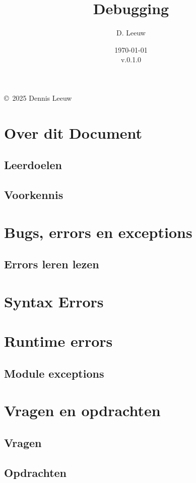\documentclass[a4paper,12pt,twoside,openright,titlepage]{book}
\author{D. Leeuw}
\title{Debugging}
\date{\today\\v.0.1.0}
\begin{document}

\maketitle

\copyright\ 2025 Dennis Leeuw\\




\frontmatter
\chapter{Over dit Document}
\section{Leerdoelen}

\section{Voorkennis}


\tableofcontents

\mainmatter

\chapter{Bugs, errors en exceptions}

\section{Errors leren lezen}


\chapter{Syntax Errors}


\chapter{Runtime errors}

\section{Module exceptions}


\chapter{Vragen en opdrachten}
\section{Vragen}

\section{Opdrachten}


\printindex
\end{document}

